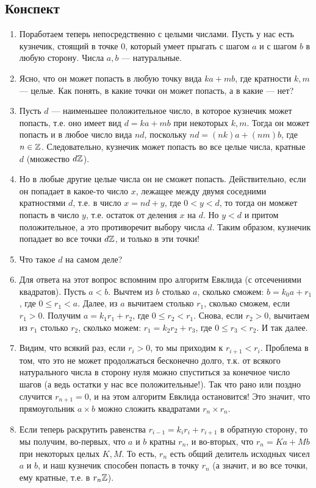 \subsection{Конспект}
\begin{enumerate}\setlength{\itemsep}{1pt}
\item Поработаем теперь непосредственно с целыми числами. Пусть у нас есть кузнечик, стоящий в точке 0, который умеет прыгать с шагом $a$ и с шагом $b$ в любую сторону. Числа $a,b$ --- натуральные.
\item Ясно, что он может попасть в любую точку вида $ka+mb$, где кратности $k,m$ --- целые. Как понять, в какие точки он может попасть, а в какие --- нет?
\item Пусть $d$ --- наименьшее положительное число, в которое кузнечик может попасть, т.е. оно имеет вид $d=ka+mb$ при некоторых $k,m$. Тогда он может попасть и в любое число вида $nd$, поскольку $nd=(nk)a+(nm)b$, где $n\in\mathbb Z$. Следовательно, кузнечик может попасть во все целые числа, кратные $d$ (множество $d\mathbb Z$).
\item Но в любые другие целые числа он не сможет попасть. Действительно, если он попадает в какое-то число $x$, лежащее между двумя соседними кратностями $d$, т.е. в число $x=nd+y$, где $0<y<d$, то тогда он момжет попасть в число $y$, т.е. остаток от деления $x$ на $d$. Но $y<d$ и притом положительное, а это противоречит выбору числа $d$. Таким образом, кузнечик попадает во все точки $d\mathbb Z$, и только в эти точки!
\item Что такое $d$ на самом деле?
\item Для ответа на этот вопрос вспомним про алгоритм Евклида (с отсечениями квадратов). Пусть $a<b$. Вычтем из $b$ столько $a$, сколько сможем: $b=k_0a+r_1$, где $0\le r_1<a$. Далее, из $a$ вычитаем столько $r_1$, сколько сможем, если $r_1>0$. Получим $a=k_1r_1+r_2$, где $0\le r_2<r_1$. Снова, если $r_2>0$, вычитаем из $r_1$ столько $r_2$, сколько можем: $r_1=k_2r_2+r_3$, где $0\le r_3<r_2$. И так далее.
\item Видим, что всякий раз, если $r_i>0$, то мы приходим к $r_{i+1}<r_i$. Проблема в том, что это не может продолжаться бесконечно долго, т.к. от всякого натурального числа в сторону нуля можно спуститься за конечное число шагов (а ведь остатки у нас все положительные!). Так что рано или поздно случится $r_{n+1}=0$, и на этом алгоритм Евклида остановится! Это значит, что прямоугольник $a\times b$ можно сложить квадратами $r_n\times r_n$.
\item Если теперь раскрутить равенства $r_{i-1}=k_ir_i+r_{i+1}$ в обратную сторону, то мы получим, во-первых, что $a$ и $b$ кратны $r_n$, и во-вторых, что $r_n=Ka+Mb$ при некоторых целых $K,M$. То есть, $r_n$ есть общий делитель исходных чисел $a$ и $b$, и наш кузнечик способен попасть в точку $r_n$ (а значит, и во все точки, ему кратные, т.е. в $r_n\mathbb Z$).

\end{enumerate}
